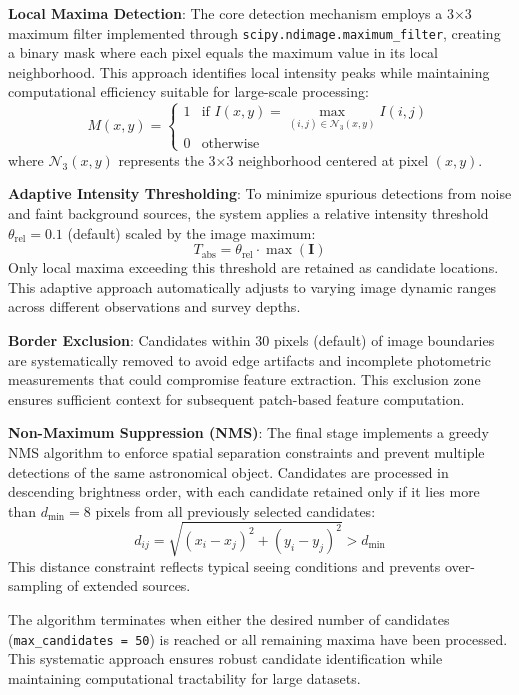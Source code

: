 \documentclass[twocolumn,10pt]{aastex631}
\begin{document}
\textbf{Local Maxima Detection}: The core detection mechanism employs a 3×3 maximum filter implemented through \texttt{scipy.ndimage.maximum\_filter}, creating a binary mask where each pixel equals the maximum value in its local neighborhood. This approach identifies local intensity peaks while maintaining computational efficiency suitable for large-scale processing:
\begin{equation}
M(x,y) = \begin{cases} 
1 & \text{if } I(x,y) = \max_{(i,j) \in \mathcal{N}_3(x,y)} I(i,j) \\
0 & \text{otherwise}
\end{cases}
\end{equation}
where $\mathcal{N}_3(x,y)$ represents the 3×3 neighborhood centered at pixel $(x,y)$.

\textbf{Adaptive Intensity Thresholding}: To minimize spurious detections from noise and faint background sources, the system applies a relative intensity threshold $\theta_{\text{rel}} = 0.1$ (default) scaled by the image maximum:
\begin{equation}
T_{\text{abs}} = \theta_{\text{rel}} \cdot \max(\mathbf{I})
\end{equation}
Only local maxima exceeding this threshold are retained as candidate locations. This adaptive approach automatically adjusts to varying image dynamic ranges across different observations and survey depths.

\textbf{Border Exclusion}: Candidates within 30 pixels (default) of image boundaries are systematically removed to avoid edge artifacts and incomplete photometric measurements that could compromise feature extraction. This exclusion zone ensures sufficient context for subsequent patch-based feature computation.

\textbf{Non-Maximum Suppression (NMS)}: The final stage implements a greedy NMS algorithm to enforce spatial separation constraints and prevent multiple detections of the same astronomical object. Candidates are processed in descending brightness order, with each candidate retained only if it lies more than $d_{\min} = 8$ pixels from all previously selected candidates:
\begin{equation}
d_{ij} = \sqrt{(x_i - x_j)^2 + (y_i - y_j)^2} > d_{\min}
\end{equation}
This distance constraint reflects typical seeing conditions and prevents over-sampling of extended sources.

The algorithm terminates when either the desired number of candidates (\texttt{max\_candidates = 50}) is reached or all remaining maxima have been processed. This systematic approach ensures robust candidate identification while maintaining computational tractability for large datasets.
\end{document}
